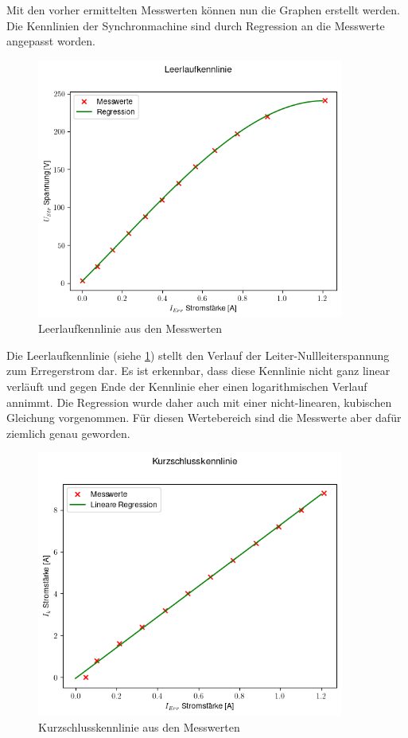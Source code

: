 \documentclass{report}
\begin{document}
Mit den vorher ermittelten Messwerten können nun die Graphen erstellt werden. Die Kennlinien der Synchronmachine sind durch Regression an die Messwerte angepasst worden.

\begin{figure}[!ht]
	\centering
	\includegraphics[width=0.9\textwidth]{./assets/img/leerlauf_kennlinie.png}
	\caption{Leerlaufkennlinie aus den Messwerten}
	\label{fig:leerlaufkennlinie}
\end{figure}

Die Leerlaufkennlinie (siehe \ref{fig:leerlaufkennlinie}) stellt den Verlauf der Leiter-Nullleiterspannung zum Erregerstrom dar. Es ist erkennbar, dass diese Kennlinie nicht ganz linear verläuft und gegen Ende der Kennlinie eher einen logarithmischen Verlauf annimmt. Die Regression wurde daher auch mit einer nicht-linearen, kubischen Gleichung vorgenommen. Für diesen Wertebereich sind die Messwerte aber dafür ziemlich genau geworden.

\begin{figure}[!ht]
	\centering
	\includegraphics[width=0.9\textwidth]{./assets/img/kurzschluss_kennlinie.png}
	\caption{Kurzschlusskennlinie aus den Messwerten}
	\label{fig:kurzschlusskennlinie}
\end{figure}
\end{document}
